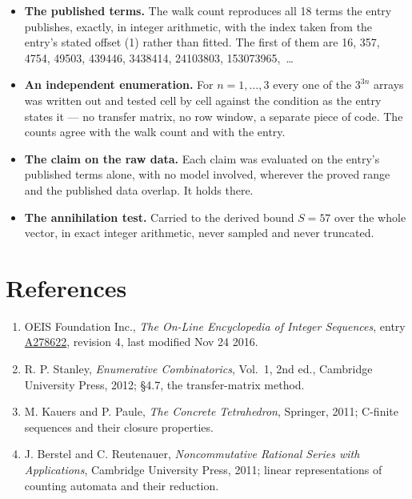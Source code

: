 \documentclass[11pt]{article}
\theoremstyle{definition}
\begin{document}
\begin{itemize}

\item {\bfseries The published terms.} The walk count reproduces all 18 terms the entry publishes, exactly, in integer arithmetic, with the index taken from the entry's stated offset (1) rather than fitted. The first of them are 16, 357, 4754, 49503, 439446, 3438414, 24103803, 153073965,~\dots

\item {\bfseries An independent enumeration.} For $n = 1,\dots,3$ every one of the $3^{3n}$ arrays was written out and tested cell by cell against the condition as the entry states it --- no transfer matrix, no row window, a separate piece of code. The counts agree with the walk count and with the entry.

\item {\bfseries The claim on the raw data.} Each claim was evaluated on the entry's published terms alone, with no model involved, wherever the proved range and the published data overlap. It holds there.

\item {\bfseries The annihilation test.} Carried to the derived bound $S = 57$ over the whole vector, in exact integer arithmetic, never sampled and never truncated.

\end{itemize}

\section{References}

\begin{enumerate}

\item OEIS Foundation Inc., \emph{The On-Line Encyclopedia of Integer Sequences}, entry \href{https://oeis.org/A278622}{A278622}, revision 4, last modified Nov 24 2016.

\item R. P. Stanley, \emph{Enumerative Combinatorics}, Vol.~1, 2nd ed., Cambridge University Press, 2012; \S4.7, the transfer-matrix method.

\item M. Kauers and P. Paule, \emph{The Concrete Tetrahedron}, Springer, 2011; C-finite sequences and their closure properties.

\item J. Berstel and C. Reutenauer, \emph{Noncommutative Rational Series with Applications}, Cambridge University Press, 2011; linear representations of counting automata and their reduction.

\end{enumerate}
\end{document}

